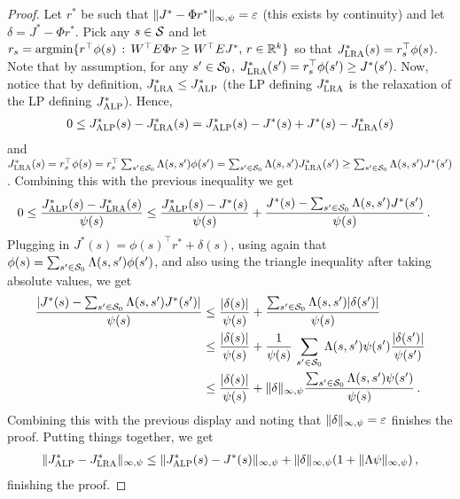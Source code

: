 \documentclass[12pt,draftcls,onecolumn]{IEEEtran}
\begin{document}
\begin{proof}
Let $r^*$ be such that $\norm{J^* - \Phi r^*}_{\infty,\psi} = \epsilon$ (this exists by continuity) and let 
$\delta = J^* - \Phi r^*$.
Pick any $s\in \S$ and let $r_s = \argmin\{ r^\top \phi(s) \,:\, W^\top E \Phi r \ge W^\top E J^*,\, r\in \Re^k \}$ 
so that $\Jlro(s) = r_s^\top \phi(s)$.
Note that by assumption, for any $s'\in \S_0$, $\Jlro(s') = r_s^\top \phi(s') \ge J^*(s')$.
Now, notice that by definition, $\Jlro \le \Jalpo$ (the LP defining $\Jlro$ is the relaxation of the LP defining $\Jalpo$).
Hence,
\begin{align*}
0\le \Jalpo(s) - \Jlro(s) = \Jalpo(s) - J^*(s) + J^*(s) - \Jlro(s)
\end{align*}
and $\Jlro(s) = r_s^\top \phi(s) = r_s^\top \sum_{s'\in \S_0} \Lambda(s,s') \phi(s') = \sum_{s'\in \S_0} \Lambda(s,s') \Jlro(s')
\ge \sum_{s'\in \S_0} \Lambda(s,s') J^*(s')$.
Combining this with the previous inequality we get
\begin{align*}
0
&\le 
 \frac{\Jalpo(s) - \Jlro(s)}{\psi(s)}
 \le
\frac{\Jalpo(s)-J^*(s)}{\psi(s)} + \frac{J^*(s) - \sum_{s'\in \S_0} \Lambda(s,s') J^*(s')}{\psi(s)}
\,.
\end{align*}
Plugging in $J^*(s) = \phi(s)^\top r^*+\delta(s)$, using again that $\phi(s) = \sum_{s'\in \S_0} \Lambda(s,s') \phi(s')$,
and also using the triangle inequality after taking absolute values, we get
\begin{align*}
 \frac{|J^*(s) - \sum_{s'\in \S_0} \Lambda(s,s') J^*(s')|}{\psi(s)} 
& \le
  \frac{|\delta(s)|}{\psi(s)} + \frac{\sum_{s'\in \S_0} \Lambda(s,s') |\delta(s')|}{\psi(s)} \\
& \le
  \frac{|\delta(s)|}{\psi(s)} + \frac{1}{\psi(s)} \, \sum_{s'\in \S_0} \Lambda(s,s') \psi(s') \frac{|\delta(s')|}{\psi(s')} \\
& \le
  \frac{|\delta(s)|}{\psi(s)} + \norm{\delta}_{\infty,\psi} \frac{\sum_{s'\in \S_0} \Lambda(s,s') \psi(s')}{\psi(s)} \, .
\end{align*}
Combining this with the previous display and noting that $\norm{\delta}_{\infty,\psi} = \epsilon$ finishes the proof.
Putting things together, we get 
\begin{align*}
\norm{\Jalpo - \Jlro}_{\infty,\psi}
\le
\norm{\Jalpo(s)-J^*(s)}_{\infty,\psi}
+ 
\norm{\delta}_{\infty,\psi} (1+ \norm{\Lambda \psi}_{\infty,\psi})\,,
\end{align*}
finishing the proof.
\fi
\end{proof}
\end{document}
